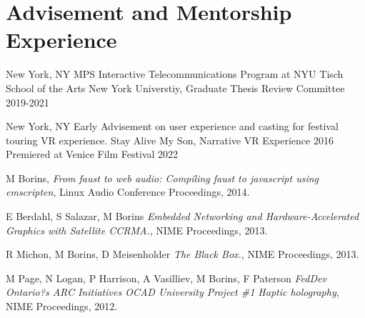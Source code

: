 \documentclass[11pt,a4paper,sans]{moderncv}   %
\begin{document}

\section{Advisement and Mentorship Experience}
\cventry
  {New York, NY}
  {MPS Interactive Telecommunications Program at NYU Tisch School of the Arts}
  {New York Universtiy, Graduate Thesis Review Committee}
  {2019-2021}{}
  {}

\cventry
  {New York, NY}
  {Early Advisement on user experience and casting for festival touring VR experience.}
  {Stay Alive My Son, Narrative VR Experience}
  {2016}{}
  {Premiered at Venice Film Festival 2022}



\begin{thebibliography}{9}

  M Borins,
  \textit{From faust to web audio: Compiling faust to javascript using emscripten},
  Linux Audio Conference Proceedings,
  2014.

  E Berdahl, S Salazar, M Borins
  \textit{Embedded Networking and Hardware-Accelerated Graphics with Satellite CCRMA.},
  NIME Proceedings,
  2013.

  R Michon, M Borins, D Meisenholder
  \textit{The Black Box.},
  NIME Proceedings,
  2013.

  M Page, N Logan, P Harrison, A Vasilliev, M Borins, F Paterson
  \textit{FedDev Ontario?s ARC Initiatives OCAD University Project \#1 Haptic holography},
  NIME Proceedings,
  2012.

\end{thebibliography}

\end{document}
